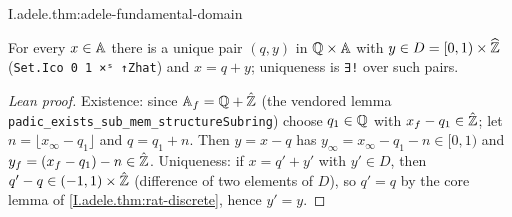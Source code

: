 \begin{theorem}
\end{theorem}
\begin{tfformal}{I.adele.thm:adele-fundamental-domain}
\begin{tffidelity}
For every $x\in\mathbb{A}$ there is a unique pair $(q,y)$ in $\mathbb{Q}\times\mathbb{A}$ with $y\in D=[0,1)\times\widehat{\mathbb{Z}}$ (\texttt{Set.Ico 0 1 ×ˢ ↑Zhat}) and $x=q+y$; uniqueness is \texttt{∃!} over such pairs.
\end{tffidelity}
\end{tfformal}
\begin{proof}[Lean proof]
Existence: since $\mathbb{A}_f=\mathbb{Q}+\hat{\mathbb{Z}}$ (the vendored lemma \texttt{padic\_exists\_sub\_mem\_structureSubring}) choose $q_1\in\mathbb{Q}$ with $x_f-q_1\in\hat{\mathbb{Z}}$; let $n=\lfloor x_\infty-q_1\rfloor$ and $q=q_1+n$. Then $y=x-q$ has $y_\infty=x_\infty-q_1-n\in[0,1)$ and $y_f=(x_f-q_1)-n\in\hat{\mathbb{Z}}$. Uniqueness: if $x=q'+y'$ with $y'\in D$, then $q'-q\in(-1,1)\times\hat{\mathbb{Z}}$ (difference of two elements of $D$), so $q'=q$ by the core lemma of \cref{I.adele.thm:rat-discrete}, hence $y'=y$.
\end{proof}

